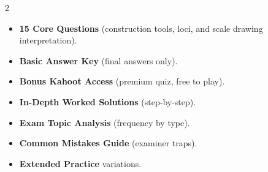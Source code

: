 \documentclass[11pt,a4paper]{article}
\newcommand{\FullReleaseDate}{April 30, 2026}
\begin{document}
\vspace{8pt}

\begin{multicols}{2}
  \begin{tcolorbox}[card, title=\sffamily\bfseries\textcolor{white}{\faHandPointDown\ TODAY (Simplified Version)}, colbacktitle=mainblue, boxed title style={sharp corners, boxrule=0pt}]
    \begin{itemize}[leftmargin=1.2em, itemsep=2pt]
      \item \small \textbf{15 Core Questions} (construction tools, loci, and scale drawing interpretation).
      \item \small \textbf{Basic Answer Key} (final answers only).
      \item \small \textbf{Bonus Kahoot Access} (premium quiz, free to play).
    \end{itemize}
  \end{tcolorbox}

  \columnbreak

  \begin{tcolorbox}[card, title=\sffamily\bfseries\textcolor{white}{\faRocket\ ON \FullReleaseDate\ (Full Upgrade)}, colbacktitle=mainblue, boxed title style={sharp corners, boxrule=0pt}]
    \begin{itemize}[leftmargin=1.2em, itemsep=2pt]
      \item \small \textbf{In-Depth Worked Solutions} (step-by-step).
      \item \small \textbf{Exam Topic Analysis} (frequency by type).
      \item \small \textbf{Common Mistakes Guide} (examiner traps).
      \item \small \textbf{Extended Practice} variations.
    \end{itemize}
  \end{tcolorbox}
\end{multicols}
\end{document}
